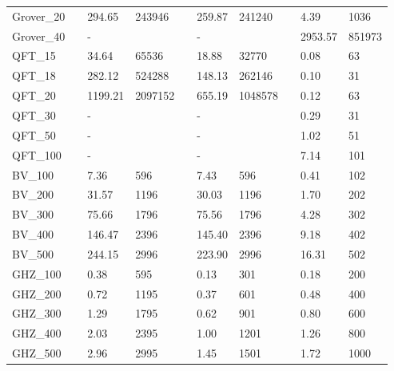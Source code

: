 \documentclass{article}
\begin{document}
\begin{itemize}[leftmargin=*]
\begin{itemize}
\begin{table}[!htbp]
{\begin{tabular}{llllllllll}
                Grover\_20 &   & 294.65 & 243946    &   & 259.87     & 241240 & & 4.39  & 1036 \\ 
                Grover\_40 &   & -      &           &   & -          &        & & 2953.57 & 851973 \\
                \hline
                QFT\_15     &  & 34.64   & 65536   &  & 18.88  & 32770   &  & 0.08 & 63  \\
                QFT\_18     &  & 282.12  & 524288  &  & 148.13 & 262146 &   & 0.10  & 31  \\
                QFT\_20     &  & 1199.21 & 2097152 &  & 655.19 & 1048578 &  & 0.12 & 63  \\
                QFT\_30     &  & -       &         &  & -      &        &  & 0.29 & 31  \\
                QFT\_50     &  & -       &         &  & -      &        &  & 1.02 & 51  \\
                QFT\_100    &  & -       &         &  & -      &        &  & 7.14 & 101 \\
                \hline
                BV\_100     &  & 7.36    & 596     &  & 7.43      & 596     &  & 0.41           & 102 \\
                BV\_200     &  & 31.57   & 1196    &  & 30.03     & 1196    &  & 1.70           & 202 \\
                BV\_300     &  & 75.66   & 1796    &  & 75.56     & 1796    &  & 4.28           & 302 \\
                BV\_400     &  & 146.47  & 2396    &  & 145.40    & 2396    &  & 9.18           & 402 \\
                BV\_500     &  & 244.15  & 2996    &  & 223.90    & 2996    &  & 16.31          & 502 \\
                \hline
                GHZ\_100    &  & 0.38    & 595     &  & 0.13      & 301    &  & 0.18           & 200 \\%
                GHZ\_200    &  & 0.72    & 1195    &  & 0.37      & 601    &  & 0.48           & 400 \\%
                GHZ\_300    &  & 1.29    & 1795    &  & 0.62      & 901    &  & 0.80           & 600 \\%
                GHZ\_400    &  & 2.03    & 2395    &  & 1.00      & 1201    &  & 1.26           & 800 \\%
                GHZ\_500    &  & 2.96    & 2995    &  & 1.45      & 1501    &  & 1.72           & 1000\\%

\end{tabular}}
\end{table}
\end{itemize}
\end{itemize}
\end{document}

